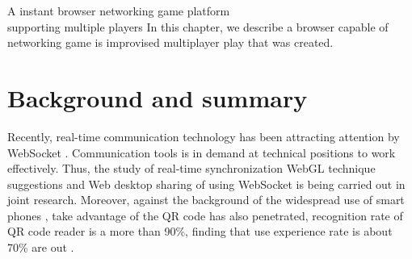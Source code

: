 \chapterhead
{A instant browser networking game platform\\
supporting multiple players}
{In this chapter, we describe a browser capable of networking game is improvised multiplayer play that was created.}


\section{Background and summary}

Recently, real-time communication technology has been attracting attention by WebSocket \cite{websocket}. Communication tools is in demand at technical positions to work effectively. Thus, the study of real-time synchronization WebGL technique suggestions \cite{websocket_webgl} and Web desktop sharing of using WebSocket \cite{weboscket_desktop} is being carried out in joint research. Moreover, against the background of the widespread use of smart phones \cite{smartphone_share}, take advantage of the QR code \cite{qrcode} has also penetrated, recognition rate of QR code reader is a more than 90\%, finding that use experience rate is about 70\% are out \cite{qrcoderesearch}.

